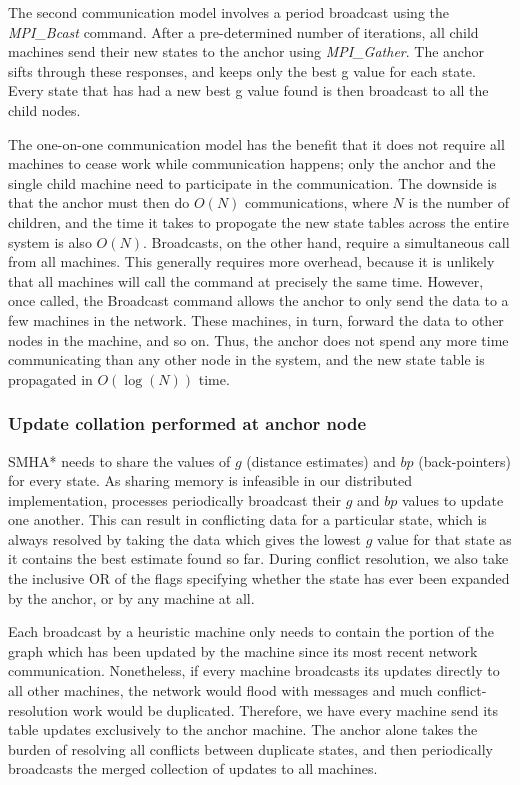 \documentclass[11pt]{article}
\begin{document}
The second communication model involves a period broadcast using the \emph{MPI\_Bcast} command. After a pre-determined number of iterations, all child machines send their new states to the anchor using \emph{MPI\_Gather}. The anchor sifts through these responses, and keeps only the best g value for each state. Every state that has had a new best g value found is then broadcast to all the child nodes.

The one-on-one communication model has the benefit that it does not require all machines to cease work while communication happens; only the anchor and the single child machine need to participate in the communication. The downside is that the anchor must then do $O(N)$ communications, where $N$ is the number of children, and the time it takes to propogate the new state tables across the entire system is also $O(N)$. Broadcasts, on the other hand, require a simultaneous call from all machines. This generally requires more overhead, because it is unlikely that all machines will call the command at precisely the same time. However, once called, the Broadcast command allows the anchor to only send the data to a few machines in the network. These machines, in turn, forward the data to other nodes in the machine, and so on. Thus, the anchor does not spend any more time communicating than any other node in the system, and the new state table is propagated in $O(\log(N))$ time.

\subsubsection*{Update collation performed at anchor node}

SMHA* needs to share the values of $g$ (distance estimates) and $bp$ (back-pointers) for every state. As sharing memory is infeasible in our distributed implementation, processes periodically broadcast their $g$ and $bp$ values to update one another. This can result in conflicting data for a particular state, which is always resolved by taking the data which gives the lowest $g$ value for that state as it contains the best estimate found so far. During conflict resolution, we also take the inclusive OR of the flags specifying whether the state has ever been expanded by the anchor, or by any machine at all.

Each broadcast by a heuristic machine only needs to contain the portion of the graph which has been updated by the machine since its most recent network communication. Nonetheless, if every machine broadcasts its updates directly to all other machines, the network would flood with messages and much conflict-resolution work would be duplicated. Therefore, we have every machine send its table updates exclusively to the anchor machine. The anchor alone takes the burden of resolving all conflicts between duplicate states, and then periodically broadcasts the merged collection of updates to all machines.
\end{document}

